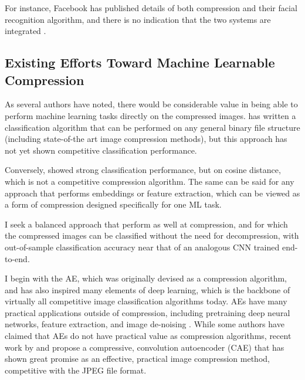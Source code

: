 \documentclass[twoside,11pt]{article}
\begin{document}
 For instance, Facebook has published details of both compression and their 
facial recognition algorithm, and there is no indication that the two systems 
are integrated \citep{collet2016zstandard, taigman2014deepface}.

\subsection{Existing Efforts Toward Machine Learnable Compression}

As several authors have noted, 
there would be considerable value in being able to perform machine learning 
tasks directly on the compressed images. \citet{needell2017} has written a classification 
algorithm that can be performed on any general binary file structure (including 
state-of-the art image compression methods), but this approach has not yet shown
 competitive classification performance. 

Conversely, \citet{fu2016} showed strong 
classification performance, but on cosine distance, which is not a competitive 
compression algorithm. The same can be said for any approach that performs 
embeddings or feature extraction, which can be viewed as a form of compression 
designed specifically for one ML task.

I seek a balanced approach that perform as well at compression,
and for which the compressed images 
can be classified without the need for decompression, with out-of-sample
 classification accuracy near that of an analogous CNN trained end-to-end.

I begin with the AE, which was originally 
devised as a compression algorithm, and has also inspired many elements of 
deep learning, which is the backbone of virtually all competitive image 
classification algorithms today.
AEs have many practical applications outside of compression, including 
pretraining deep neural networks, feature extraction, 
and image de-noising \citep{baldi2012autoencoders}. While some authors have claimed that AEs do 
not have practical value as compression algorithms,
recent work by 
\citet{theis2017} and \cite{cheng2018deep} propose a compressive, convolution autoencoder (CAE) that 
has shown great promise as an effective, practical image compression method, 
competitive with the JPEG file format.
\end{document}
